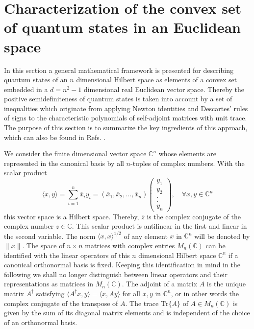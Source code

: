 \documentclass[12pt]{iopart}
\begin{document}
\section{Characterization of the convex set of quantum states in an Euclidean space}
\label{I}

In this section a general mathematical framework is presented for describing 
quantum states of an $n$ dimensional Hilbert space as elements of a convex set embedded in a $d=n^2-1$ dimensional real Euclidean vector space. 
Thereby the positive semidefiniteness of quantum states is taken into account by a set of inequalities which originate from applying Newton identities \cite{Horn} 
and Descartes' rules of signs \cite{D1,D2} to the characteristic polynomials of self-adjoint matrices with unit trace. The purpose of this section is to summarize the key ingredients of this approach, which can 
also be found in Refs. \cite{Kimura, Byrd, Kryszewski, Gamel}.

We consider the finite dimensional vector space $\mathbb{C}^n$ whose elements are represented in the canonical basis by all $n$-tuples of complex numbers. With the scalar product
\begin{equation}
 \langle x, y\rangle=\sum^n_{i=1} \overline{x}_i y_i=(\overline{x}_1,\overline{x}_2, \dots, \overline{x}_n) \left(
\begin{array}{c}
y_1\\
y_2\\
. \\
.\\
y_n
\end{array}
\right), \quad \forall x,y \in \mathbb{C}^n \nonumber
\end{equation}
this vector space is a Hilbert space. Thereby, $\overline{z}$ is the complex conjugate of the complex number $z \in \mathbb{C}$. This scalar product is antilinear in the first and linear in the second variable.
The norm $\langle x,x \rangle^{1/2}$ of any element $x$ in $\mathbb{C}^n$ will be denoted by $\|x\|$. The space of $n \times n$ matrices with complex entries $M_n(\mathbb{C})$ 
can be identified with the linear operators of this $n$ dimensional Hilbert space $\mathbb{C}^n$ if a canonical orthonormal basis is fixed. Keeping this identification in mind in the 
following we shall no longer distinguish between linear operators and their representations as matrices in $M_n(\mathbb{C})$.
The adjoint of a matrix $A$ is the unique matrix $A^\dagger$ satisfying $\langle A^\dagger x, y \rangle=\langle x, Ay \rangle$ for all $x,y$ in $\mathbb{C}^n$, or in other words 
the complex conjugate of the transpose of $A$. The trace $\mathrm{Tr}\{A\}$ of $A\in M_n(\mathbb{C})$ is given by the sum of its diagonal matrix elements and
is independent of the choice of an orthonormal basis. 
\end{document}
